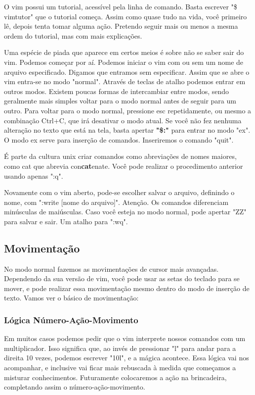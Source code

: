 \documentclass[a4paper, 12pt]{article}
\begin{document}
O vim possui um tutorial, acessível pela linha de comando.
Basta escrever "\$ vimtutor" que o tutorial começa.
Assim como quase tudo na vida, você primeiro lê, depois tenta tomar alguma ação.
Pretendo seguir mais ou menos a mesma ordem do tutorial, mas com mais explicações.

Uma espécie de piada que aparece em certos meios é sobre não se saber sair do vim.
Podemos começar por aí.
Podemos iniciar o vim com ou sem um nome de arquivo especificado.
Digamos que entramos sem especificar.
Assim que se abre o vim entra-se no modo "normal".
Através de teclas de atalho podemos entrar em outros modos.
Existem poucas formas de intercambiar entre modos, sendo geralmente mais simples voltar para o modo normal antes de seguir para um outro.
Para voltar para o modo normal, pressione esc repetidamente, ou mesmo a combinação Ctrl+C, que irá desativar o modo atual.
Se você não fez nenhuma alteração no texto que está na tela, basta apertar \textbf{"\$:"} para entrar no modo "ex".
O modo ex serve para inserção de comandos.
Inseriremos o comando "quit".

É parte da cultura unix criar comandos como abreviações de nomes maiores, como cat que abrevia con\textbf{cat}enate.
Você pode realizar o procedimento anterior usando apenas ":q".

Novamente com o vim aberto, pode-se escolher salvar o arquivo, definindo o nome, com ":write [nome do arquivo]".
Atenção. Os comandos diferenciam minúsculas de maiúsculas.
Caso você esteja no modo normal, pode apertar "ZZ" para salvar e sair. Um atalho para ":wq".


\subsection{Movimentação}
No modo normal fazemos as movimentações de cursor mais avançadas.
Dependendo da sua versão de vim, você pode usar as setas do teclado para se mover, e pode realizar essa movimentação mesmo dentro do modo de inserção de texto.
Vamos ver o básico de movimentação:

\subsubsection{Lógica Número-Ação-Movimento}
Em muitos casos podemos pedir que o vim interprete nossos comandos com um multiplicador.
Isso significa que, ao invés de pressionar "l" para andar para a direita 10 vezes, podemos escrever "10l", e a mágica acontece.
Essa lógica vai nos acompanhar, e inclusive vai ficar mais rebuscada à medida que começamos a misturar conhecimentos.
Futuramente colocaremos a ação na brincadeira, completando assim o número-ação-movimento.
\end{document}

